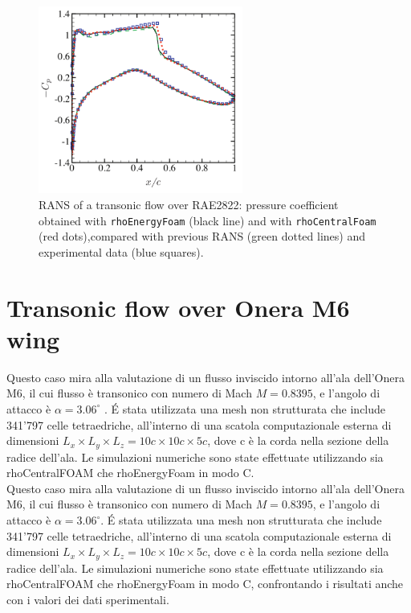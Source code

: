 \documentclass[a5paper]{sapthesis}
\begin{document}
	\begin{figure}[htp]
		\centering
		\includegraphics[width=0.6\textwidth]{Figures/Cp_RAE2822}
		\caption[Pressure coefficient of RANS of a transonic flow over RAE2822]{RANS of a transonic flow over RAE2822: pressure coefficient obtained with \texttt{rhoEnergyFoam} (black line) and with \texttt{rhoCentralFoam} (red dots),compared with previous
		RANS (green dotted lines) and experimental data (blue squares).}
		\label{Cp_RAE2822}
	\end{figure}

	\section{Transonic flow over Onera M6 wing}
	Questo caso mira alla valutazione di un flusso inviscido intorno all'ala dell'Onera M6, il cui flusso è transonico con numero di Mach $M = 0.8395$, e l'angolo di attacco è $\alpha = 3.06^\circ$ . \'E stata utilizzata una mesh non strutturata che include 341'797 celle tetraedriche, all'interno di una scatola computazionale esterna di dimensioni $L_x \times L_y \times L_z = 10c \times 10c \times 5c$, dove c è la corda nella sezione della radice dell'ala. Le simulazioni numeriche sono state effettuate utilizzando sia rhoCentralFOAM che rhoEnergyFoam in modo C.
	\\
		Questo caso mira alla valutazione di un flusso inviscido intorno all'ala dell'Onera M6, il cui flusso è transonico con numero di Mach $M = 0.8395$, e l'angolo di attacco è $\alpha = 3.06^\circ$. \'E stata utilizzata una mesh non strutturata che include 341'797 celle tetraedriche, all'interno di una scatola computazionale esterna di dimensioni $L_x \times L_y \times L_z = 10c \times 10c \times 5c$, dove c è la corda nella sezione della radice dell'ala. Le simulazioni numeriche sono state effettuate utilizzando sia rhoCentralFOAM che rhoEnergyFoam in modo C, confrontando i risultati anche con i valori dei dati sperimentali.
	
\end{document}
